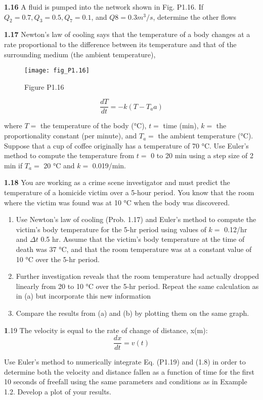 \documentclass[../main.tex]{subfiles}
\begin{document}
\begin{multicols}{2}
\textbf{1.16} A fluid is pumped into the network shown in Fig. P1.16.
If $Q_2 = 0.7, Q_3 = 0.5, Q_7 = 0.1$, and $Q8 = 0.3 m^3/s$, determine
the other flows


\textbf{1.17} Newton's law of cooling says that the temperature of a
body changes at a rate proportional to the difference between
its temperature and that of the surrounding medium (the ambient temperature),
\begin{figure}[H]
	\centering
	\texttt{[image: fig\_P1.16]}
   \caption*{Figure P1.16}
   \label{fig_1.}
\end{figure}

$$\dfrac{dT}{dt}= -k(T -T_aa)$$

where $T =$ the temperature of the body (°C), $t =$ time (min),
$k =$ the proportionality constant (per minute), and $T_a =$ the
ambient temperature (°C). Suppose that a cup of coffee originally has a temperature of 70 °C. Use Euler's method to
compute the temperature from $t =$ 0 to 20 min using a step
size of 2 min if $T_a =$ 20 °C and $k =$ 0.019/min.

\textbf{1.18} You are working as a crime scene investigator and
must predict the temperature of a homicide victim over a
5-hour period. You know that the room where the victim was
found was at 10 °C when the body was discovered.
\begin{enumerate}[label=(\alph*)]
	\item Use Newton's law of cooling (Prob. 1.17) and Euler's
	method to compute the victim's body temperature for
	the 5-hr period using values of $k=$  0.12/hr and $\Delta t$
	0.5 hr. Assume that the victim's body temperature at
	the time of death was 37 °C, and that the room temperature was at a constant value of 10 °C over the 5-hr
	period.
	\item Further investigation reveals that the room temperature
	had actually dropped linearly from 20 to 10 °C over the
	5-hr period. Repeat the same calculation as in (a) but incorporate this new information
	\item Compare the results from (a) and (b) by plotting them
	on the same graph. 
\end{enumerate}

\textbf1.19 The velocity is equal to the rate of change of distance,
x(m):
$$\dfrac{dx}{dt} = v(t)$$


Use Euler's method to numerically integrate Eq. (P1.19) and
(1.8) in order to determine both the velocity and distance
fallen as a function of time for the first 10 seconds of freefall
using the same parameters and conditions as in Example 1.2.
Develop a plot of your results.


\end{multicols}
\end{document}
